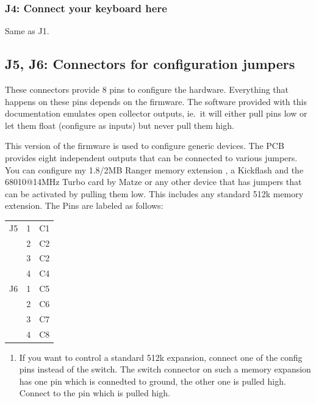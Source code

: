 \documentclass[DIV10]{scrartcl}
\begin{document}
\subsubsection{J4:  Connect your keyboard here}
Same as J1.

\subsection{J5, J6: Connectors for configuration jumpers}
\label{sec:config-jumpers}
These connectors provide 8 pins to configure the hardware. Everything
that happens on these pins depends on the firmware. The software
provided with this documentation emulates open collector outputs, ie.\
it will either pull pins low or let them float (configure as inputs)
but never pull them high.

This version of the firmware is used to configure generic devices. The
PCB provides eight independent outputs that can be connected to
various jumpers. You can configure my 1.8/2MB Ranger memory
extension \cite{Memory}, a Kickflash \cite{Kickflash-Thread,Kickflash-Manual} and
the 68010@14MHz Turbo card by Matze \cite{Turbokarte} or any other
device that has jumpers that can be activated by pulling them
low. This includes any standard 512k memory extension.  The Pins are
labeled as follows:
\begin{center}
  \begin{tabular}{|ll|l|}
    \hline
    J5 & 1 & C1 \\
    & 2 & C2 \\
    & 3 & C2 \\
    & 4 & C4 \\
    \hline
    J6 & 1 & C5 \\
    & 2 & C6 \\
    & 3 & C7 \\
    & 4 & C8
    \\ \hline
  \end{tabular}
\end{center}
\begin{enumerate}[Note 1:]
\item \label{item:remark-memory} If you want to control a standard
  512k expansion, connect one of the config pins instead of the
  switch. The switch connector on such a memory expansion has one pin
  which is connedted to ground, the other one is pulled high. Connect
  to the pin which is pulled high.
\end{enumerate}
\end{document}
